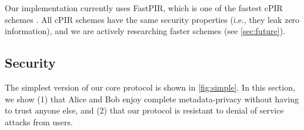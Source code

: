 Our implementation currently uses FastPIR, which is one of the fastest cPIR schemes \cite{ahmad2021addra}. All cPIR schemes have the same security properties (i.e., they leak zero information), and we are actively researching faster schemes (see \cref{sec:future}).

\subsection{Security}

The simplest version of our core protocol is shown in \cref{fig:simple}. In this section, we show (1) that Alice and Bob enjoy complete metadata-privacy without having to trust anyone else, and (2) that our protocol is resistant to denial of service attacks from users.





